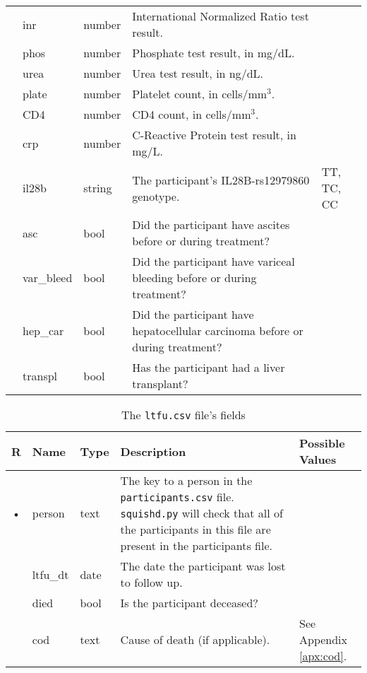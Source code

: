 \documentclass{article}
\begin{document}
\begin{table}[h!]
\begin{tabular}{cllp{6cm}p{4cm}}
    & inr           & number    & International Normalized Ratio test result. & \\
    & phos          & number    & Phosphate test result, in mg/dL. & \\
    & urea          & number    & Urea test result, in ng/dL. & \\
    & plate         & number    & Platelet count, in cells/mm$^3$. & \\
    & CD4           & number    & CD4 count, in cells/mm$^3$. & \\
    & crp           & number    & C-Reactive Protein test result, in mg/L. & \\
    & il28b         & string    & The participant's IL28B-rs12979860 genotype. & TT, TC, CC \\
    & asc           & bool      & Did the participant have ascites before or during treatment? & \\
    & var\_bleed    & bool      & Did the participant have variceal bleeding before or during treatment? & \\
    & hep\_car      & bool      & Did the participant have hepatocellular carcinoma before or during treatment? & \\
    & transpl       & bool      & Has the participant had a liver transplant? & \\
  \end{tabular}
\end{table}


\begin{table}[h!]
  \centering
  \caption{The \texttt{ltfu.csv} file's fields}
  \label{tbl:ltfu.csv}
  \begin{tabular}{cllp{6cm}p{4cm}}
    R & Name            & Type      & Description & Possible Values \\ \hline
    • & person          & text      & The key to a person in the \texttt{participants.csv}
    file. \texttt{squishd.py} will check that all of the participants in this file
    are present in the participants file. & \\
      & ltfu\_dt        & date      & The date the participant was lost to follow up. & \\
      & died            & bool      & Is the participant deceased? & \\
      & cod             & text    & Cause of death (if applicable). & See Appendix \ref{apx:cod}.\\
  \end{tabular}
\end{table}
\end{document}
